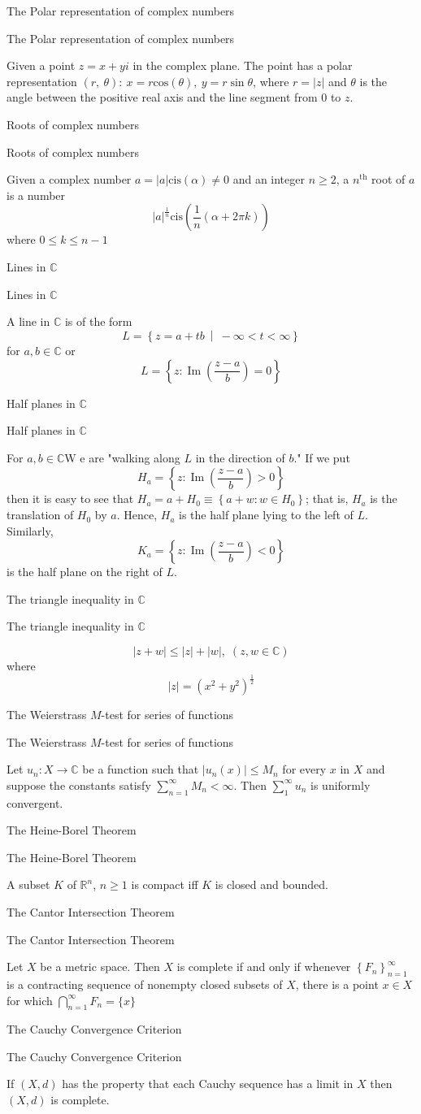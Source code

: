 \documentclass[17pt]{extarticle}
\newcommand{\R}{\mathbb{R}}
\newcommand{\C}{\mathbb{C}}
\newcommand{\LS}{\left\lbrace}
\newcommand{\RS}{\right\rbrace}
\newcommand{\MM}{\ \middle|\ }
\renewcommand{\cos}[1]{\text{cos}\left(#1\right)}
\newcommand{\boxset}[2]{\begin{mdframed}[style=darkQuesion]
  #1
    \end{mdframed}
    \newpage
    \begin{mdframed}[style=darkQuesion]
      #1
        \end{mdframed}
    \begin{mdframed}[style=darkAnswer]
      #2
        \end{mdframed}
        \newpage
  }
\begin{document}
\par
\newpage
\boxset{The Polar representation of complex numbers}
{Given a point $z=x+yi$ in the complex plane. The point has a polar
representation $\left( r,\ \theta\right):\ x=r\cos{\theta},\ y=r\sin{\theta}$, where $r=\left|z\right|$
and $\theta$ is the angle between the positive real axis and the line
segment from $0$ to $z$.}
\boxset{Roots of complex numbers}
{Given a complex number $a=\left|a\right|\text{cis}\left(\alpha\right)\neq 0$ and an integer
$n\geq 2$, a $n^{\text{th}}$
root of $a$ is a number
\[\left|a\right|^{\frac{1}{n}}\text{cis}\left( \frac{1}{n}\left( \alpha+2\pi k\right)\right)\]
where $0\leq k \leq n-1$
}
\boxset{Lines in $\C$}
{A line in $\C$ is of the form
\[L=\LS z=a+tb\MM -\infty<t<\infty\RS \]
for $a,b\in\C$ or
\[L=\left\{z: \operatorname{Im}\left(\frac{z-a}{b}\right)=0\right\}\]
}
\boxset{Half planes in $\C$}
{For $a,b\in\C$W e are "walking along $L$ in the direction of $b$." If we put
\[H_{a}=\left\{z: \operatorname{Im}\left(\frac{z-a}{b}\right)>0\right\}\]
then it is easy to see that $H_{a}=a+H_{0} \equiv\left\{a+w: w \in H_{0}\right\}$; that is, $H_{a}$ is the translation of $H_{0}$ by $a$. Hence, $H_{a}$ is the half plane lying to the left of $L$. Similarly,
\[K_{a}=\left\{z: \operatorname{Im}\left(\frac{z-a}{b}\right)<0\right\}\]
is the half plane on the right of $L$.}
\boxset{The triangle inequality in $\C$}
{\[|z+w| \leq|z|+|w|,\;(z, w \in \C)\]
where
\[|z|=\left(x^{2}+y^{2}\right)^{\frac{1}{2}}\]
}
\boxset{The Weierstrass $M$-test for series of functions}
{
 Let $u_{n}: X \rightarrow \C$ be a function such that $\left|u_{n}(x)\right| \leq M_{n}$ for every $x$ in $X$ and suppose the constants satisfy $\sum_{n=1}^{\infty} M_{n}<\infty$. Then $\sum_{1}^{\infty} u_{n}$ is uniformly convergent.
}
\boxset{The Heine-Borel Theorem}
{A subset $K$ of $\R^n$, $n\geq 1$ is compact iff $K$ is closed and bounded.}
\boxset{The Cantor Intersection Theorem}
{Let $X$ be a metric space. Then $X$ is complete if and only if whenever $\left\{F_{n}\right\}_{n=1}^{\infty}$ is a contracting sequence of nonempty closed subsets of $X$, there is a point $x \in X$ for which $\bigcap_{n=1}^{\infty} F_{n}=\{x\}$}
\boxset{The Cauchy Convergence Criterion}
{If $(X, d)$ has the property that each Cauchy sequence has a limit in $X$ then $(X, d)$ is complete.}
\end{document}

